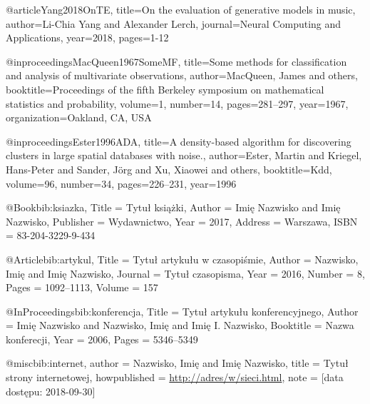 @article{Yang2018OnTE,
  title={On the evaluation of generative models in music},
  author={Li-Chia Yang and Alexander Lerch},
  journal={Neural Computing and Applications},
  year={2018},
  pages={1-12}
}

@inproceedings{MacQueen1967SomeMF,
  title={Some methods for classification and analysis of multivariate observations},
  author={MacQueen, James and others},
  booktitle={Proceedings of the fifth Berkeley symposium on mathematical statistics and probability},
  volume={1},
  number={14},
  pages={281--297},
  year={1967},
  organization={Oakland, CA, USA}
}

@inproceedings{Ester1996ADA,
  title={A density-based algorithm for discovering clusters in large spatial databases with noise.},
  author={Ester, Martin and Kriegel, Hans-Peter and Sander, J{\"o}rg and Xu, Xiaowei and others},
  booktitle={Kdd},
  volume={96},
  number={34},
  pages={226--231},
  year={1996}
}

@Book{bib:ksiazka,
Title                    = {Tytu{\l} ksi{\k{a}}{\.{z}}ki},
Author                   = {Imi{\k{e}} Nazwisko and Imi{\k{e}} Nazwisko},
Publisher                = {Wydawnictwo},
Year                     = {2017},
Address                  = {Warszawa},
ISBN                     = {83-204-3229-9-434}
}

@Article{bib:artykul,
Title                    = {Tytu{\l} artyku{\l}u w czasopi{\'{s}}mie},
Author                   = {Nazwisko, Imi{\k{e}} and Imi{\k{e}} Nazwisko},
Journal                  = {Tytu{\l} czasopisma},
Year                     = {2016},
Number                   = {8},
Pages                    = {1092--1113},
Volume                   = {157}
}

@InProceedings{bib:konferencja,
  Title                    = {Tytu{\l} artyku{\l}u konferencyjnego},
  Author                   = {Imi{\k{e}} Nazwisko and Nazwisko, Imi{\k{e}} and Imi{\k{e}} I. Nazwisko},
  Booktitle                = {Nazwa konferecji},
  Year                     = {2006},
  Pages                    = {5346--5349}
}

@misc{bib:internet,
  author = {Nazwisko, Imi{\k{e}} and Imi{\k{e}} Nazwisko},
  title = {Tytu{\l} strony internetowej},
  howpublished = {\url{http://adres/w/sieci.html}},
  note = {[data dostępu: 2018-09-30]}
}

